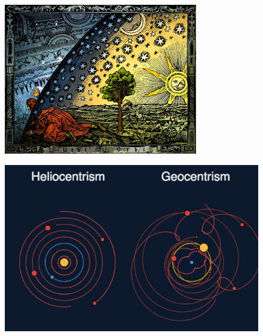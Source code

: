 \documentclass{beamer}
\begin{document}

\begin{frame}
\begin{figure}
 \centering
 \includegraphics[scale=0.8]{Imagenes/boveda_celeste_copernico}
 \end{figure}
\end{frame}

\begin{frame}
\begin{figure}
 \centering
 \includegraphics[scale=0.7]{Imagenes/Helio_Geo}
 \end{figure}
\end{frame}
\end{document}

